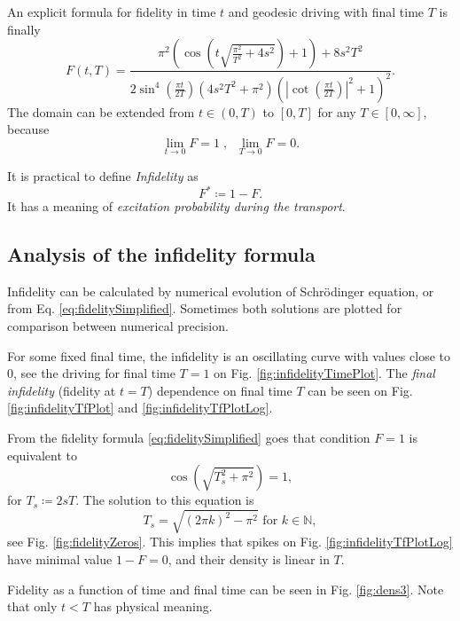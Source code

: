 An explicit formula for fidelity in time $t$ and geodesic driving with final time $T$ is finally
\begin{equation}
    F(t,T)=\frac{\pi ^2 \left(\cos \left(t \sqrt{\frac{\pi ^2}{T^2}+4 s^2}\right)+1\right)+8 s^2 T^2}{2 \sin ^4\left(\frac{\pi  t}{2 T}\right) \left(4 s^2 T^2+\pi ^2\right) \left(\left| \cot \left(\frac{\pi  t}{2 T}\right)\right|^2+1\right)^2}.
    \label{eq:fidelitySimplified}
\end{equation}
The domain can be extended from $t\in(0,T)$ to $[0,T]$ for any $T\in[0,\infty]$, because 
$$
    \lim_{t\rightarrow 0}F=1\; ,\;\; \lim_{T\rightarrow 0}F=0.
$$

It is practical to define \emph{Infidelity} as
\begin{equation}
    F^*\coloneqq 1-F.
\end{equation} 
It has a meaning of \emph{excitation probability during the transport}.


\subsection{Analysis of the infidelity formula}
Infidelity can be calculated by numerical evolution of Schr\"odinger equation, or from Eq. \ref{eq:fidelitySimplified}. Sometimes both solutions are plotted for comparison between numerical precision. 

For some fixed final time, the infidelity is an oscillating curve with values close to $0$, see the driving for final time $T=1$ on Fig. \ref{fig:infidelityTimePlot}. The \emph{final infidelity} (fidelity at $t=T$) dependence on final time $T$ can be seen on Fig. \ref{fig:infidelityTfPlot} and \ref{fig:infidelityTfPlotLog}.

From the fidelity formula \ref{eq:fidelitySimplified} goes that condition $F=1$ is equivalent to
\begin{equation}
    \cos \left(\sqrt{T_s^2+\pi ^2}\right)=1,
\end{equation}
for $T_s\coloneqq 2s T$. The solution to this equation is
\begin{equation}
    T_s=\sqrt{(2 \pi  k)^2-\pi ^2} \text{  for }k\in \mathbb{N},
    \label{eq:solutionT}
\end{equation}
see Fig. \ref{fig:fidelityZeros}. This implies that spikes on Fig. \ref{fig:infidelityTfPlotLog} have minimal value $1-F=0$, and their density is linear in $T$.

Fidelity as a function of time and final time can be seen in Fig. \ref{fig:dens3}. Note that only $t<T$ has physical meaning.


